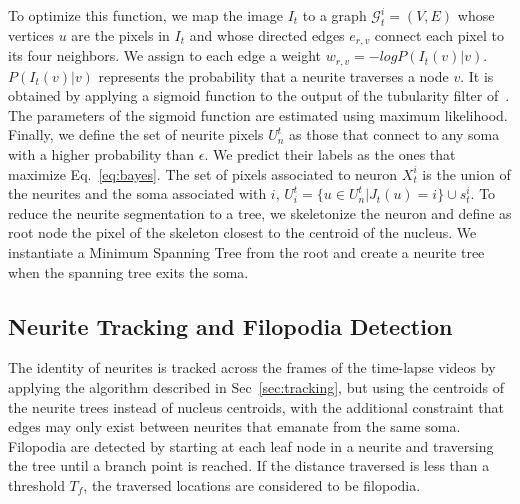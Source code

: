To optimize this function, we map  the image $I_t$ to a graph $\mathcal{G}_t^i =
(V,E)$  whose vertices  $u$ are  the pixels  in $I_t$  and whose  directed edges
$e_{r,v}$ connect  each pixel to its four  neighbors.  We assign to  each edge a
weight $w_{r,v}  = -log P(I_t(v)|v)$.  $P(I_t(v)|v)$  represents the probability
that  a neurite  traverses a  node $v$.  It is  obtained by  applying  a sigmoid
function  to  the  output  of  the tubularity  filter  of~\cite{Frangi98}.   The
parameters   of    the   sigmoid   function   are    estimated   using   maximum
likelihood. Finally, we  define the set of neurite pixels  $U_n^t$ as those that
connect to any soma with a higher probability than $\epsilon$.  We predict their
labels  as  the  ones  that  maximize Eq.~\ref{eq:bayes}.   The  set  of  pixels
associated  to  neuron  $X_t^i$ is  the  union  of  the  neurites and  the  soma
associated with  $i$, $ U_i^t  = \{u \in  U_n^t | J_t(u)  = i\} \cup  s_t^i$. To
reduce the neurite segmentation to a  tree, we skeletonize the neuron and define
as  root  node  the pixel  of  the  skeleton  closest  to  the centroid  of  the
nucleus.  We instantiate  a Minimum  Spanning Tree  from the  root and  create a
neurite tree when the spanning tree exits the soma.




\subsection{Neurite Tracking and Filopodia Detection}
\label{sec:neurite}
\vspace{-2mm}  The identity  of neurites  is tracked  across the  frames  of the
time-lapse videos by applying the algorithm described in Sec~\ref{sec:tracking},
but using the centroids of the  neurite trees instead of nucleus centroids, with
the  additional constraint  that  edges  may only  exist  between neurites  that
emanate from  the same soma.   Filopodia are detected  by starting at  each leaf
node in a  neurite and traversing the  tree until a branch point  is reached. If
the distance traversed  is less than a threshold  $T_f$, the traversed locations
are considered to be filopodia.




